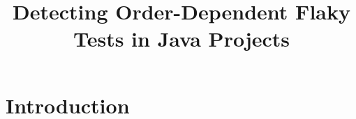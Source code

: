 \documentclass[10pt,conference]{IEEEtran}
\begin{document}
\title{Detecting Order-Dependent Flaky Tests in Java Projects}
\author{}
\maketitle
\section{Introduction}
\lipsum[1-4]
\end{document}
